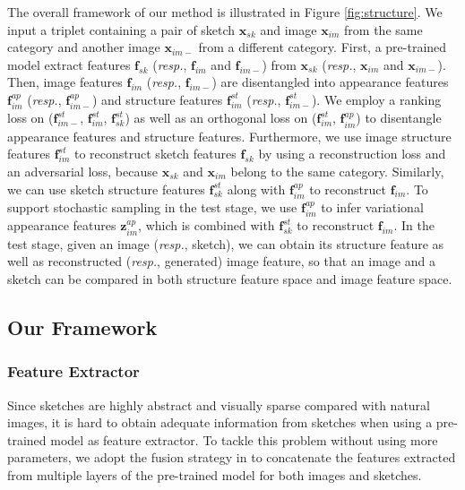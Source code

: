 \documentclass[10pt,twocolumn,letterpaper]{article}
\begin{document}
The overall framework of our method is illustrated in Figure \ref{fig:structure}. 
We input a triplet containing a pair of sketch $\mathbf{x}_{sk}$ and image $\mathbf{x}_{im}$ from the same category and another image $\mathbf{x}_{im-}$ from a different category. First, a pre-trained model extract features $\mathbf{f}_{sk}$ (\emph{resp.}, $\mathbf{f}_{im}$ and $\mathbf{f}_{im-}$) from $\mathbf{x}_{sk}$ (\emph{resp.}, $\mathbf{x}_{im}$ and $\mathbf{x}_{im-}$).
Then, image features $\mathbf{f}_{im}$ (\emph{resp.}, $\mathbf{f}_{im-}$) are disentangled into appearance features $\mathbf{f}_{im}^{ap}$ (\emph{resp.}, $\mathbf{f}_{im-}^{ap}$) and structure features $\mathbf{f}_{im}^{st}$ (\emph{resp.}, $\mathbf{f}_{im-}^{st}$). We employ a ranking loss on ($\mathbf{f}_{im-}^{st}$, $\mathbf{f}_{im}^{st}$, $\mathbf{f}_{sk}^{st}$) as well as an orthogonal loss on ($\mathbf{f}_{im}^{st}$, $\mathbf{f}_{im}^{ap}$) to disentangle appearance features and structure features. Furthermore, we use image structure features $\mathbf{f}_{im}^{st}$ to reconstruct sketch features $\mathbf{f}_{sk}$ by using a reconstruction loss and an adversarial loss, because $\mathbf{x}_{sk}$ and $\mathbf{x}_{im}$ belong to the same category. Similarly, we can use sketch structure features $\mathbf{f}_{sk}^{st}$ along with $\mathbf{f}_{im}^{ap}$ to reconstruct $\mathbf{f}_{im}$. To support stochastic sampling in the test stage, we use $\mathbf{f}_{im}^{ap}$ to infer variational appearance features $\mathbf{z}_{im}^{ap}$, which is combined with $\mathbf{f}_{sk}^{st}$ to reconstruct $\mathbf{f}_{im}$. In the test stage, given an image (\emph{resp.}, sketch), we can obtain its structure feature as well as reconstructed (\emph{resp.}, generated) image feature, so that an image and a sketch can be compared in both structure feature space and image feature space. 

\subsection{Our Framework} \label{3.2}

\subsubsection{Feature Extractor} 
Since sketches are highly abstract and visually sparse compared with natural images, it is hard to obtain adequate information from sketches when using a pre-trained model as feature extractor. To tackle this problem without using more parameters, we adopt the fusion strategy in \cite{wang2019stacked} to concatenate the features extracted from multiple layers of the pre-trained model for both images and sketches.
\end{document}
